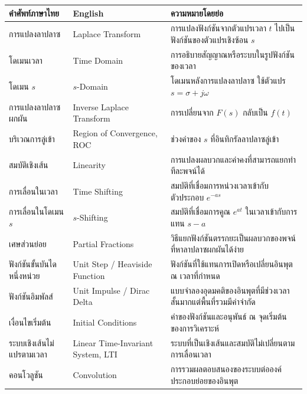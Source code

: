 \begin{table}[htbp]
    \centering
    \small
    \begin{tabularx}{\textwidth}{>{\raggedright\arraybackslash}p{} >{\raggedright\arraybackslash}p{} X}
        \hline
        \textbf{คำศัพท์ภาษาไทย} & \textbf{English} & \textbf{ความหมายโดยย่อ} \\
        \hline
        การแปลงลาปลาซ & Laplace Transform & การแปลงฟังก์ชันจากตัวแปรเวลา $t$ ไปเป็นฟังก์ชันของตัวแปรเชิงซ้อน $s$ \\
        โดเมนเวลา & Time Domain & การอธิบายสัญญาณหรือระบบในรูปฟังก์ชันของเวลา \\
        โดเมน $s$ & $s$-Domain & โดเมนหลังการแปลงลาปลาซ ใช้ตัวแปร $s=\sigma+j\omega$ \\
        การแปลงลาปลาซผกผัน & Inverse Laplace Transform & การเปลี่ยนจาก $F(s)$ กลับเป็น $f(t)$ \\
        บริเวณการลู่เข้า & Region of Convergence, ROC & ช่วงค่าของ $s$ ที่อินทิกรัลลาปลาซลู่เข้า \\
        สมบัติเชิงเส้น & Linearity & การแปลงผลบวกและค่าคงที่สามารถแยกทำทีละพจน์ได้ \\
        การเลื่อนในเวลา & Time Shifting & สมบัติที่เชื่อมการหน่วงเวลาเข้ากับตัวประกอบ $e^{-as}$ \\
        การเลื่อนในโดเมน $s$ & $s$-Shifting & สมบัติที่เชื่อมการคูณ $e^{at}$ ในเวลาเข้ากับการแทน $s-a$ \\
        เศษส่วนย่อย & Partial Fractions & วิธีแยกฟังก์ชันตรรกยะเป็นผลบวกของพจน์ที่หาลาปลาซผกผันได้ง่าย \\
        ฟังก์ชันขั้นบันไดหนึ่งหน่วย & Unit Step / Heaviside Function & ฟังก์ชันที่ใช้แทนการเปิดหรือเปลี่ยนอินพุต ณ เวลาที่กำหนด \\
        ฟังก์ชันอิมพัลส์ & Unit Impulse / Dirac Delta & แบบจำลองอุดมคติของอินพุตที่มีช่วงเวลาสั้นมากแต่พื้นที่รวมมีค่าจำกัด \\
        เงื่อนไขเริ่มต้น & Initial Conditions & ค่าของฟังก์ชันและอนุพันธ์ ณ จุดเริ่มต้นของการวิเคราะห์ \\
        ระบบเชิงเส้นไม่แปรตามเวลา & Linear Time-Invariant System, LTI & ระบบที่เป็นเชิงเส้นและสมบัติไม่เปลี่ยนตามการเลื่อนเวลา \\
        คอนโวลูชัน & Convolution & การรวมผลตอบสนองของระบบต่อองค์ประกอบย่อยของอินพุต \\
        \hline
    \end{tabularx}
\end{table}



